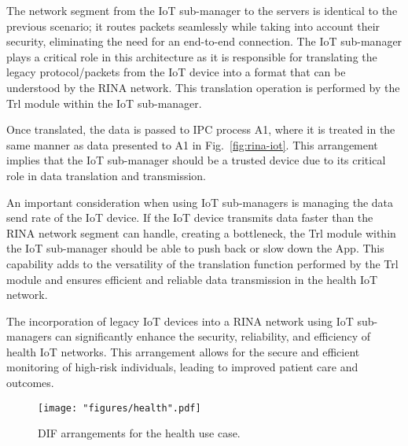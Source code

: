 \documentclass{ieeeaccess}
\begin{document}
The network segment from the IoT sub-manager to the servers is identical to the previous scenario; it routes packets seamlessly while taking into account their security, eliminating the need for an end-to-end connection. The IoT sub-manager plays a critical role in this architecture as it is responsible for translating the legacy protocol/packets from the IoT device into a format that can be understood by the RINA network. This translation operation is performed by the Trl module within the IoT sub-manager.

Once translated, the data is passed to IPC process A1, where it is treated in the same manner as data presented to A1 in Fig.~\ref{fig:rina-iot}. This arrangement implies that the IoT sub-manager should be a trusted device due to its critical role in data translation and transmission.

An important consideration when using IoT sub-managers is managing the data send rate of the IoT device. If the IoT device transmits data faster than the RINA network segment can handle, creating a bottleneck, the Trl module within the IoT sub-manager should be able to push back or slow down the App. This capability adds to the versatility of the translation function performed by the Trl module and ensures efficient and reliable data transmission in the health IoT network.

The incorporation of legacy IoT devices into a RINA network using IoT sub-managers can significantly enhance the security, reliability, and efficiency of health IoT networks. This arrangement allows for the secure and efficient monitoring of high-risk individuals, leading to improved patient care and outcomes.


\begin{figure}[!t]
	\centering
	\texttt{[image: "figures/health".pdf]}
	\caption{DIF arrangements for the health use case.}
	\label{fig:rina-health}
\end{figure}
\end{document}
